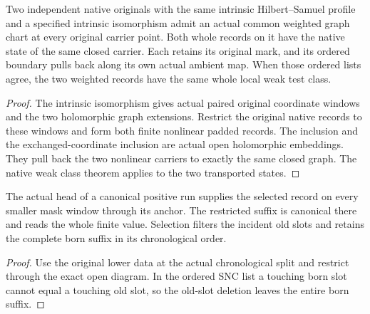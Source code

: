 \begin{theorem}
\label{hir:g1-actual-common-graph-native-class}
\leanok
Two independent native originals with the same intrinsic
Hilbert--Samuel profile and a specified intrinsic
isomorphism admit an actual common weighted graph chart
at every original carrier point. Both whole records on
it have the native state of the same closed carrier.
Each retains its original mark, and its ordered
boundary pulls back along its own actual ambient map.
When those ordered lists agree, the two weighted records
have the same whole local weak test class.
\end{theorem}
\begin{proof}
The intrinsic isomorphism gives actual paired original
coordinate windows and the two holomorphic graph
extensions. Restrict the original native records to
these windows and form both finite nonlinear padded
records. The inclusion and the exchanged-coordinate
inclusion are actual open holomorphic embeddings.
They pull back the two nonlinear carriers to exactly
the same closed graph. The native weak class theorem
applies to the two transported states.
\end{proof}

\begin{theorem}
\label{hir:g1-advanced-born-finite-read}
\leanok
The actual head of a canonical positive run supplies
the selected record on every smaller mask window through
its anchor. The restricted suffix is canonical there
and reads the whole finite value. Selection filters the
incident old slots and retains the complete born suffix
in its chronological order.
\end{theorem}
\begin{proof}
Use the original lower data at the actual chronological
split and restrict through the exact open diagram. In
the ordered SNC list a touching born slot cannot equal
a touching old slot, so the old-slot deletion leaves
the entire born suffix.
\end{proof}

